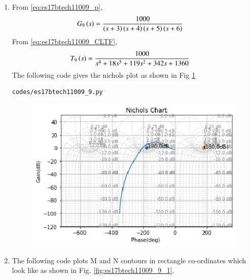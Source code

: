 \begin{enumerate}[label=\thesection.\arabic*.,ref=\thesection.\theenumi]
\item
From \eqref{eq:es17btech11009_p},
\begin{align}
G_{9}\brak{s} &=\frac{1000}{\brak{s+3}\brak{s+4}\brak{s+5}\brak{s+6}}
\label{eq:es17btech11009_ii}
\end{align}
\solution
From \eqref{eq:es17btech11009_CLTF}, 
\begin{align}
T_9\brak{s} &=\frac{1000}{s^4 + 18s^3 + 119s^2 + 342s + 1360}
\label{eq:es17btech11009_91}
\end{align}
The following code gives the nichols plot as shown in Fig \ref{fig:es17btech11009_fig9}
\begin{lstlisting}
codes/es17btech11009_9.py
\end{lstlisting}
\begin{figure}[!h]
\includegraphics[width=\columnwidth]{./figs/es17btech11009_9.eps}
\caption{}
\label{fig:es17btech11009_fig9}
\end{figure}
\item
The following code plots  M and N contours in rectangle co-ordinates which look like as shown in Fig. \ref{fig:es17btech11009_9_1}.


\end{enumerate}
